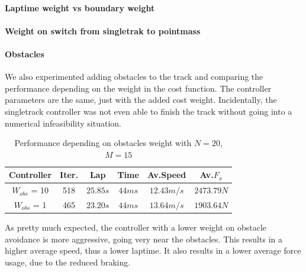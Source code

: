 \documentclass[a4paper, onecolumn, 12pt]{article}
\begin{document}
\paragraph{Laptime weight vs boundary weight}

\paragraph{Weight on switch from singletrak to pointmass}

\paragraph{Obstacles}
We also experimented adding obstacles to the track and comparing the performance
depending on the weight in the cost function. The controller parameters are the
same, just with the added cost weight. Incidentally, the singletrack controller
was not even able to finish the track without going into a numerical
infeasibility situation. 
\begin{table}[H] 
    \centering
    \caption{Performance depending on obstacles weight with $N=20$, $M=15$} \label{obstacles_ippodromo}
    \begin{tabular}{|c||c|c|c|c|c|}
        \hline
        \textbf{Controller} & \textbf{Iter.} & \textbf{Lap} & \textbf{Time} & \textbf{Av.Speed} & \textbf{Av.$F_x$} \\ [0.5ex] 
        \hline
        \hline
        $W_{obs}$ = 10 & 518 & $25.85 s$ & $44 ms$ & $12.43 m/s$ & $2473.79 N$\\
        \hline
        $W_{obs}$ = 1 & 465 & $23.20 s$ & $44 ms$ & $13.64 m/s$ & $1903.64 N$\\
        \hline
    \end{tabular}
\end{table}
As pretty much expected, the controller with a lower weight on obstacle
avoidance is more aggressive, going very near the obstacles. This results in a
higher average speed, thus a lower laptime. It also results in a lower average
force usage, due to the reduced braking. 
\end{document}
